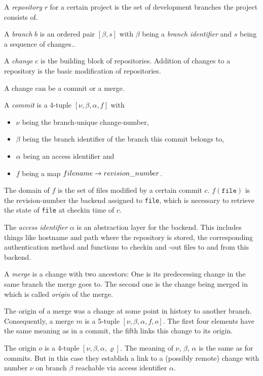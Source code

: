 \documentclass[fleqn, 10pt, a4paper]{article}
\begin{document}
A \emph{repository} $r$ for a certain project is the set of development
branches the project consists of.

A \emph{branch} $b$ is an ordered pair $[\beta, s]$ with $\beta$ being
a \emph{branch identifier} and $s$ being
a sequence of changes..

A \emph{change} $c$ is the building block of repositories.
Addition of changes to a repository is the basic modification
of repositories.

A change can be a commit or a merge.

A \emph{commit} is a 4-tuple $[\nu, \beta, \alpha, f]$ with
\begin{itemize}
\item $\nu$ being the branch-unique change-number,
\item $\beta$ being the branch identifier of the branch
this commit belongs to,
\item $\alpha$ being an access identifier and
\item $f$ being a map $\mathnormal{filename} \rightarrow
\mathnormal{revision\_number}$.
\end{itemize}

The domain of $f$ is the set of files modified by a certain
commit $c$. $f(\mathtt{file})$ is the revision-number the
backend assigned to \texttt{file}, which is necessary to
retrieve the state of \texttt{file} at checkin time of $c$.

The \emph{access identifier} $\alpha$ is an abstraction layer for the
backend. This includes things like hostname and path where the
repository is stored, the corresponding authentication method
and functions to checkin and -out files to and from this backend.

A \emph{merge} is a change with two ancestors:
One is its predecessing change in the same branch the merge
goes to. The second one is the change being merged in which is
called \emph{origin} of the merge.

The origin of a merge was a change at some
point in history to another branch. Consequently, a merge $m$ is
a 5-tuple $[\nu, \beta, \alpha, f, o]$. The first four elements
have the same meaning as in a commit, the fifth links this change
to its origin.

The origin $o$ is a 4-tuple $[\nu, \beta, \alpha, \varrho]$. The meaning
of $\nu$, $\beta$, $\alpha$ is the same as for commits. But
in this case they establish a link to a (possibly remote)
change with number $\nu$
on branch $\beta$ reachable via access identifier $\alpha$.
\end{document}
